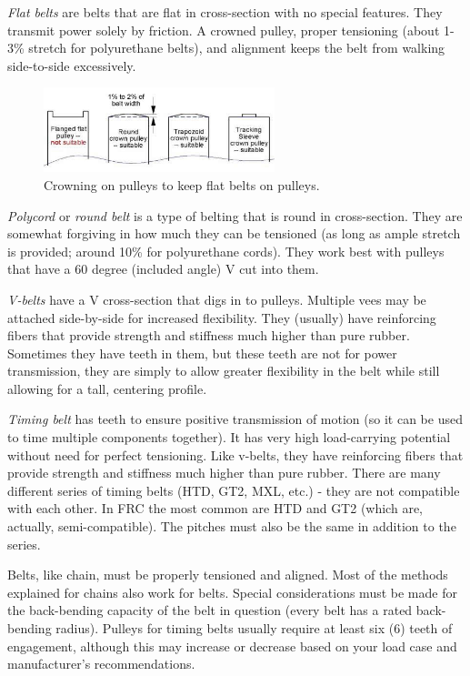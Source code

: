 \documentclass[10pt,letterpaper]{book}
\begin{document}
\begin{asparaenum}[a)]
	\item \textit{Flat belts} are belts that are flat in cross-section with no special features. They transmit power solely by friction. A crowned pulley, proper tensioning (about 1-3\% stretch for polyurethane belts), and alignment keeps the belt from walking side-to-side excessively.
	\begin{figure}[H]
		\includegraphics[width=0.6\textwidth]{imgs/belt_crown_pulley.jpeg}
		\caption{Crowning on pulleys to keep flat belts on pulleys.}
	\end{figure}
	\item \textit{Polycord} or \textit{round belt} is a type of belting that is round in cross-section. They are somewhat forgiving in how much they can be tensioned (as long as ample stretch is provided; around 10\% for polyurethane cords). They work best with pulleys that have a 60 degree (included angle) V cut into them.
	\item \textit{V-belts} have a V cross-section that digs in to pulleys. Multiple vees may be attached side-by-side for increased flexibility. They (usually) have reinforcing fibers that provide strength and stiffness much higher than pure rubber. Sometimes they have teeth in them, but these teeth are not for power transmission, they are simply to allow greater flexibility in the belt while still allowing for a tall, centering profile.
	\item \textit{Timing belt} has teeth to ensure positive transmission of motion (so it can be used to time multiple components together). It has very high load-carrying potential without need for perfect tensioning. Like v-belts, they have reinforcing fibers that provide strength and stiffness much higher than pure rubber. There are many different series of timing belts (HTD, GT2, MXL, etc.) - they are not compatible with each other. In FRC the most common are HTD and GT2 (which are, actually, semi-compatible). The pitches must also be the same in addition to the series.
\end{asparaenum}

Belts, like chain, must be properly tensioned and aligned. Most of the methods explained for chains also work for belts. Special considerations must be made for the back-bending capacity of the belt in question (every belt has a rated back-bending radius). Pulleys for timing belts usually require at least six (6) teeth of engagement, although this may increase or decrease based on your load case and manufacturer's recommendations. 
\end{document}

